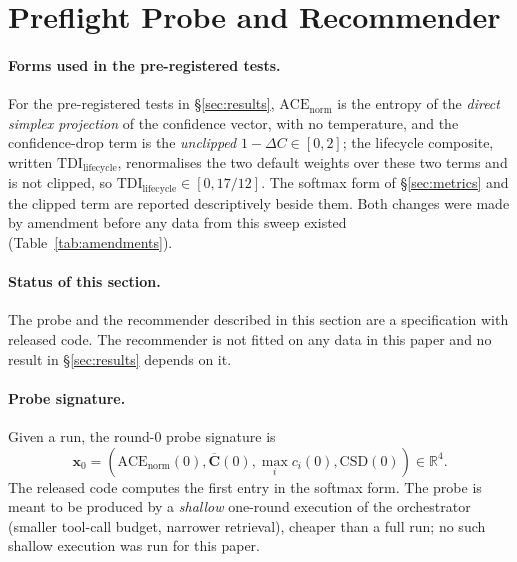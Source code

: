 \documentclass[10pt,a4paper]{article}
\begin{document}
\section{Preflight Probe and Recommender}\label{sec:probe}

\paragraph{Forms used in the pre-registered tests.} For the pre-registered tests in
\S\ref{sec:results}, $\mathrm{ACE}_{\mathrm{norm}}$ is the entropy of the \emph{direct
simplex projection} of the confidence vector, with no temperature, and the confidence-drop
term is the \emph{unclipped} $1-\Delta C\in[0,2]$; the lifecycle composite, written
$\mathrm{TDI}_{\mathrm{lifecycle}}$, renormalises the
two default weights over these two terms and is not clipped, so
$\mathrm{TDI}_{\mathrm{lifecycle}}\in[0,17/12]$. The softmax form of \S\ref{sec:metrics} and the clipped
term are reported descriptively beside them. Both changes were made by amendment before any
data from this sweep existed (Table~\ref{tab:amendments}).

\paragraph{Status of this section.} The probe and the recommender described in this section are a
specification with released code. The recommender is not fitted on any data in
this paper and no result in \S\ref{sec:results} depends on it.

\paragraph{Probe signature.} Given a run, the round-$0$ probe signature is
\[\mathbf{x}_0 = (\mathrm{ACE}_{\mathrm{norm}}(0), \overline{\mathbf{C}}(0),
\max_i c_i(0), \mathrm{CSD}(0)) \in \mathbb{R}^4.\]
The released code computes the first entry in the softmax form. The probe is
meant to be produced by a \emph{shallow} one-round execution of the orchestrator
(smaller tool-call budget, narrower retrieval), cheaper than a full run; no such
shallow execution was run for this paper.
\end{document}
